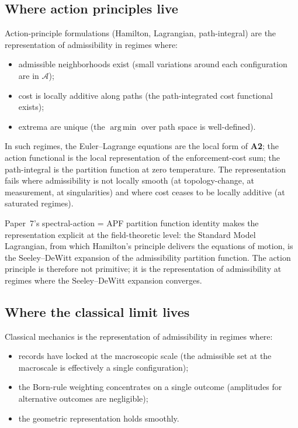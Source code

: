 \documentclass[11pt]{article}
\newcommand{\argmin}{\mathop{\mathrm{arg\,min}}}
\begin{document}
\subsection{Where action principles live}\label{sec:where_action}

Action-principle formulations (Hamilton, Lagrangian, path-integral) are the representation of admissibility in regimes where:

\begin{itemize}
    \item admissible neighborhoods exist (small variations around each configuration are in $\mathcal{A}$);
    \item cost is locally additive along paths (the path-integrated cost functional exists);
    \item extrema are unique (the $\argmin$ over path space is well-defined).
\end{itemize}

\noindent In such regimes, the Euler--Lagrange equations are the local form of \textbf{A2}; the action functional is the local representation of the enforcement-cost sum; the path-integral is the partition function at zero temperature. The representation fails where admissibility is not locally smooth (at topology-change, at measurement, at singularities) and where cost ceases to be locally additive (at saturated regimes).

Paper~7's spectral-action = APF partition function identity makes the representation explicit at the field-theoretic level: the Standard Model Lagrangian, from which Hamilton's principle delivers the equations of motion, is the Seeley--DeWitt expansion of the admissibility partition function. The action principle is therefore not primitive; it is the representation of admissibility at regimes where the Seeley--DeWitt expansion converges.

\subsection{Where the classical limit lives}\label{sec:where_classical}

Classical mechanics is the representation of admissibility in regimes where:

\begin{itemize}
    \item records have locked at the macroscopic scale (the admissible set at the macroscale is effectively a single configuration);
    \item the Born-rule weighting concentrates on a single outcome (amplitudes for alternative outcomes are negligible);
    \item the geometric representation holds smoothly.
\end{itemize}
\end{document}
